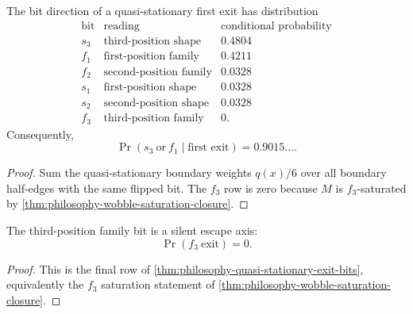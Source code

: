 \begin{theorem}
\label{thm:philosophy-quasi-stationary-exit-bits}
The bit direction of a quasi-stationary first exit has distribution
$$
\begin{array}{c|l|r}
  \text{bit} & \text{reading} & \text{conditional probability}\\
  \hline
  s_{3} & \text{third-position shape} & 0.4804\\
  f_{1} & \text{first-position family} & 0.4211\\
  f_{2} & \text{second-position family} & 0.0328\\
  s_{1} & \text{first-position shape} & 0.0328\\
  s_{2} & \text{second-position shape} & 0.0328\\
  f_{3} & \text{third-position family} & 0.
\end{array}
$$
Consequently,
$$
  \Pr(s_{3}\ \text{or}\ f_{1}\mid\text{first exit})
  =
  0.9015\ldots.
$$
\end{theorem}
\begin{proof}
Sum the quasi-stationary boundary weights $q(x)/6$ over all boundary
half-edges with the same flipped bit. The $f_{3}$ row is zero because
$M$ is $f_{3}$-saturated by
\autoref{thm:philosophy-wobble-saturation-closure}.
\end{proof}

\begin{corollary}
\label{cor:philosophy-f3-silent-escape-axis}
The third-position family bit is a silent escape axis:
$$
  \Pr(f_{3}\ \text{exit})=0.
$$
\end{corollary}
\begin{proof}
This is the final row of
\autoref{thm:philosophy-quasi-stationary-exit-bits}, equivalently the
$f_{3}$ saturation statement of
\autoref{thm:philosophy-wobble-saturation-closure}.
\end{proof}

